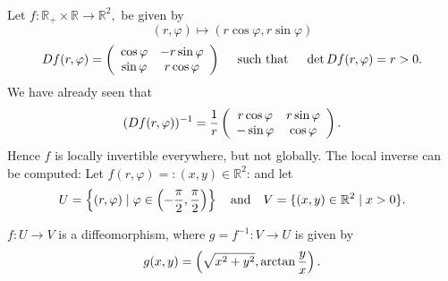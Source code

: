  \begin{frame}[fragile] \frametitle{}

  Let $f\colon \mathbb{R}_+ \times \mathbb{R} \rightarrow \mathbb{R}^2, $
  be given by 
      \[( r, \varphi ) \mapsto (r \cos \varphi, r \sin \varphi)\]
        \[D f(r, \varphi) = \left( \begin{array}{c c}
	      \cos \varphi & -r \sin \varphi \\
	            \sin \varphi & r \cos \varphi
		        \end{array} \right)
			  \quad \text{ such that } \quad \det D f(r, \varphi) = r > 0.\]
			  We have already seen that
			    \[(D f(r, \varphi))^{-1} = {1 \over r} \left( \begin{array}{c c}
			          r \cos \varphi & r \sin \varphi \\
				      -  \sin \varphi & \cos \varphi
					    \end{array} \right).\]
					    Hence $f$ is locally invertible everywhere, but not globally.
					    The local inverse can be computed:
						  Let $f(r, \varphi)=: (x,y) \in \mathbb{R}^2$:
						  and let
						      \[U = \left\{ (r, \varphi) \mid \varphi \in \left( - {\pi \over 2}, {\pi \over 2}\right) \right\}
						        \quad \text{and} \quad
							  V = \{ (x,y) \in \mathbb{R}^2 \mid x > 0 \}.\]

							    $f\colon U \rightarrow V$ is a diffeomorphism, where
							     $g = f^{-1}\colon V \rightarrow U$ is given by
							        \[g(x,y) = \left(\sqrt{x^2 + y^2}, \arctan {y \over x}\right).\]
\end{frame}

